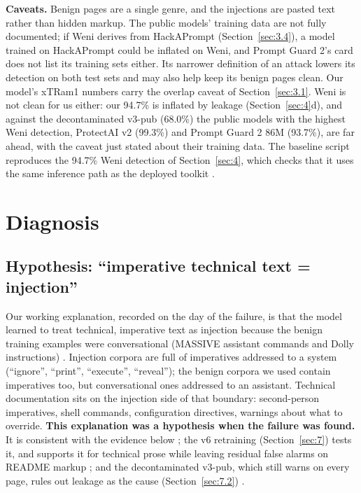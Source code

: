 \documentclass[11pt]{article}
\begin{document}
\textbf{Caveats.} Benign pages are a single genre, and the injections are pasted text rather than hidden markup. The public models' training data are not fully documented; if Weni derives from HackAPrompt (Section~\ref{sec:3.4}), a model trained on HackAPrompt could be inflated on Weni, and Prompt Guard 2's card does not list its training sets either. Its narrower definition of an attack lowers its detection on both test sets and may also help keep its benign pages clean. Our model's xTRam1 numbers carry the overlap caveat of Section~\ref{sec:3.1}. Weni is not clean for us either: our 94.7\% is inflated by leakage (Section~\ref{sec:4}d), and against the decontaminated v3-pub (68.0\%) the public models with the highest Weni detection, ProtectAI v2 (99.3\%) and Prompt Guard 2 86M (93.7\%), are far ahead, with the caveat just stated about their training data. The baseline script reproduces the 94.7\% Weni detection of Section~\ref{sec:4}, which checks that it uses the same inference path as the deployed toolkit%
.

\section{Diagnosis}\label{sec:6}

\subsection{Hypothesis: ``imperative technical text = injection''}\label{sec:6.1}

Our working explanation, recorded on the day of the failure, is that the model learned to treat technical, imperative text as injection because the benign training examples were conversational (MASSIVE assistant commands and Dolly instructions)%
. Injection corpora are full of imperatives addressed to a system (``ignore'', ``print'', ``execute'', ``reveal''); the benign corpora we used contain imperatives too, but conversational ones addressed to an assistant. Technical documentation sits on the injection side of that boundary: second-person imperatives, shell commands, configuration directives, warnings about what to override. \textbf{This explanation was a hypothesis when the failure was found.} It is consistent with the evidence below%
; the v6 retraining (Section~\ref{sec:7}) tests it, and supports it for technical prose while leaving residual false alarms on README markup%
; and the decontaminated v3-pub, which still warns on every page, rules out leakage as the cause (Section~\ref{sec:7.2})%
.
\end{document}
